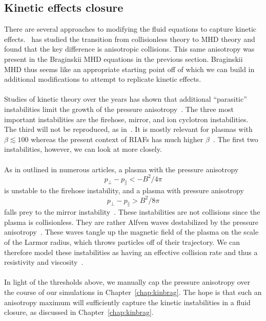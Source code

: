 \subsection{Kinetic effects closure}\label{ssec:kinclosure}
There are several approaches to modifying the fluid equations to capture kinetic effects.~\citet{Sharma2003} has studied the transition from collisionless theory to MHD theory and found that the key difference is anisotropic collisions. This same anisotropy was present in the Braginskii MHD equations in the previous section. Braginskii MHD thus seems like an appropriate starting point off of which we can build in additional modifications to attempt to replicate kinetic effects.\\
\\
Studies of kinetic theory over the years has shown that additional ``parasitic'' instabilities limit the growth of the pressure anisotropy~\cite{Sharma2008, Kunz2016}. The three most important instabilities are the firehose, mirror, and ion cyclotron instabilities. The third will not be reproduced, as in~\citet{Sharma2008}. It is mostly relevant for plasmas with $\beta\lesssim100$ whereas the present context of RIAFs has much higher $\beta$~\cite{Sharma2007}. The first two instabilities, however, we can look at more closely. \\
\\
As in outlined in numerous articles, a plasma with the pressure anisotropy
\begin{equation}
  p_\perp-p_\parallel<-B^2/4\pi\label{eq:fhthresh}
\end{equation}
is unstable to the firehose instability, and a plasma with pressure anisotropy
\begin{equation}
  p_\perp-p_\parallel >B^2/8\pi \label{eq:mirrorthresh}
\end{equation}
falls prey to the mirror instability~\cite{Kunz2016,Kunz2014,Schekochihin2008,Sharma2008}. These instabilities are not collisions since the plasma is collisionless. They are rather Alfven waves destabilized by the pressure anisotropy~\cite{Sharma2008}. These waves tangle up the magnetic field of the plasma on the scale of the Larmor radius, which throws particles off of their trajectory. We can therefore model these instabilities as having an effective collision rate and thus a resistivity and viscosity~\cite{Schekochihin2008,Kunz2017p}.\\
\\
In light of the thresholds above, we manually cap the pressure anisotropy over the course of our simulations in Chapter~\ref{chap:kinbrag}. The hope is that such an anisotropy maximum will sufficiently capture the kinetic instabilities in a fluid closure, as discussed in Chapter~\ref{chap:kinbrag}.

